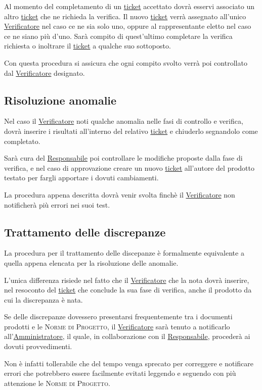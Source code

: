 \documentclass[11pt,a4paper]{article}
\begin{document}
Al momento del completamento di un \underline{ticket} accettato dovrà esservi associato un altro \underline{ticket} che ne richieda la verifica. Il nuovo \underline{ticket} verrà assegnato all'unico \underline{Verificatore} nel caso ce ne sia solo uno, oppure al rappresentante eletto nel caso ce ne siano più d'uno. Sarà compito di quest'ultimo completare la verifica richiesta o inoltrare il \underline{ticket} a qualche suo sottoposto.

Con questa procedura si assicura che ogni compito svolto verrà poi controllato dal \underline{Verificatore} designato.
\subsection{Risoluzione anomalie}
Nel caso il \underline{Verificatore} noti qualche anomalia nelle fasi di controllo e verifica, dovrà inserire i risultati all'interno del relativo \underline{ticket} e chiuderlo segnandolo come completato.

Sarà cura del \underline{Responsabile} poi controllare le modifiche proposte dalla fase di verifica, e nel caso di approvazione creare un nuovo \underline{ticket} all'autore del prodotto testato per fargli apportare i dovuti cambiamenti.

La procedura appena descritta dovrà venir svolta finchè il \underline{Verificatore} non notificherà più errori nei suoi test.
\subsection{Trattamento delle discrepanze}
La procedura per il trattamento delle discepanze è formalmente equivalente a quella appena elencata per la risoluzione delle anomalie.

L'unica differenza risiede nel fatto che il \underline{Verificatore} che la nota dovrà inserire, nel resoconto del \underline{ticket} che conclude la sua fase di verifica, anche il prodotto da cui la discrepanza è nata.

Se delle discrepanze dovessero presentarsi frequentemente tra i documenti prodotti e le \textsc{Norme di Progetto}, il \underline{Verificatore} sarà tenuto a notificarlo all'\underline{Amministratore}, il quale, in collaborazione con il \underline{Responsabile}, procederà ai dovuti provvedimenti.

Non è infatti tollerabile che del tempo venga sprecato per correggere e notificare errori che potrebbero essere facilmente evitati leggendo e seguendo con più attenzione le \textsc{Norme di Progetto}.
\end{document}

